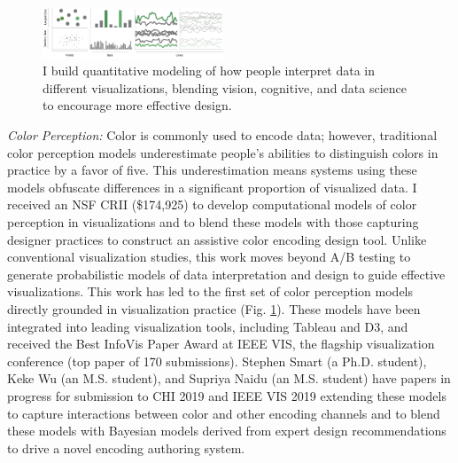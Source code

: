 \documentclass[11pt]{article}
\begin{document}
\begin{figure}
	\begin{center}
		\includegraphics[width=0.48\textwidth]{teaserOne.pdf}
	\end{center}
	\caption{I build quantitative modeling of how people interpret data in different visualizations, blending vision, cognitive, and data science to encourage more effective design.}\label{color}
\end{figure}

\emph{Color Perception: } Color is commonly used to encode data; however, traditional color perception models underestimate people's abilities to distinguish colors in practice by a favor of five. This underestimation means systems using these models obfuscate differences in a significant proportion of visualized data. %
I received an NSF CRII (\$174,925) to 
develop computational models of color perception in visualizations and to blend these models with those capturing designer practices to construct an assistive color encoding design tool.
Unlike conventional visualization studies, this work moves beyond A/B testing to generate probabilistic models of data interpretation and design to guide effective visualizations. 
This work has led to the first set of color perception models directly grounded in visualization practice
\cite{szafir2018Modeling} (Fig. \ref{color}). %
These models have been integrated into leading visualization tools, including Tableau and D3, and received the Best InfoVis Paper Award at IEEE VIS, the flagship visualization conference (top paper of 170 submissions). Stephen Smart (a Ph.D. student), Keke Wu (an M.S. student), and Supriya Naidu (an M.S. student) have papers in progress for submission to CHI 2019 and IEEE VIS 2019 extending these models to capture interactions between color and other encoding channels and to blend these models with Bayesian models derived from expert design recommendations to drive a novel encoding authoring system.
\end{document}
